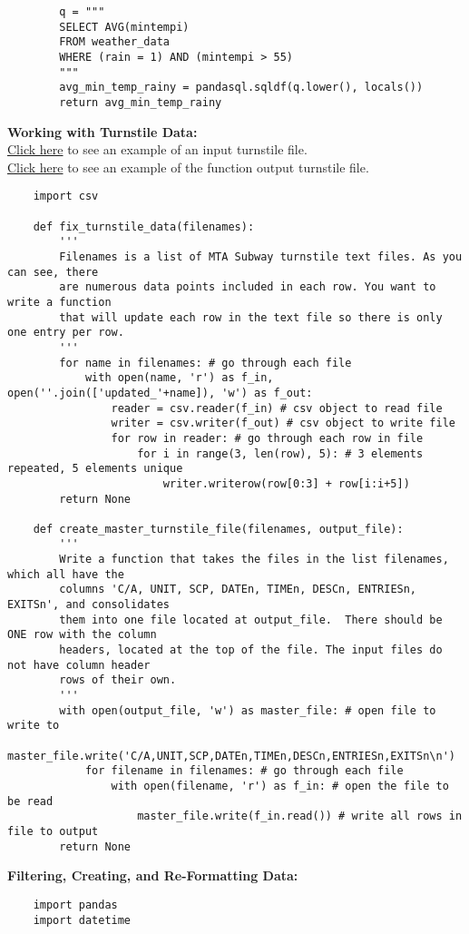 \documentclass[11pt, a4paper]{article}
\begin{document}
\begin{spacing}{1.1}
\begin{lstlisting}
		q = """
		SELECT AVG(mintempi)
		FROM weather_data
		WHERE (rain = 1) AND (mintempi > 55)
		"""
		avg_min_temp_rainy = pandasql.sqldf(q.lower(), locals())
		return avg_min_temp_rainy	
	\end{lstlisting}\newpage

	\noindent \textbf{Working with Turnstile Data:}\vspace*{1mm}\\
	\href{http://video.udacity-data.com.s3.amazonaws.com/topher/2017/January/58733a51_turnstile-110528/turnstile-110528.txt}{Click here} to see an example of an input turnstile file. \\
	\href{http://video.udacity-data.com.s3.amazonaws.com/topher/2017/January/58733aca_solution-turnstile-110528/solution-turnstile-110528.txt}{Click here} to see an example of the function output turnstile file. 
	\begin{lstlisting}
	import csv
	
	def fix_turnstile_data(filenames):
		'''
		Filenames is a list of MTA Subway turnstile text files. As you can see, there
		are numerous data points included in each row. You want to write a function
		that will update each row in the text file so there is only one entry per row.
		'''
		for name in filenames: # go through each file
			with open(name, 'r') as f_in, open(''.join(['updated_'+name]), 'w') as f_out:
				reader = csv.reader(f_in) # csv object to read file
				writer = csv.writer(f_out) # csv object to write file
				for row in reader: # go through each row in file
					for i in range(3, len(row), 5): # 3 elements repeated, 5 elements unique
						writer.writerow(row[0:3] + row[i:i+5])
		return None
		
	def create_master_turnstile_file(filenames, output_file):
		'''
		Write a function that takes the files in the list filenames, which all have the 
		columns 'C/A, UNIT, SCP, DATEn, TIMEn, DESCn, ENTRIESn, EXITSn', and consolidates
		them into one file located at output_file.  There should be ONE row with the column
		headers, located at the top of the file. The input files do not have column header
		rows of their own.
		'''
		with open(output_file, 'w') as master_file: # open file to write to
			master_file.write('C/A,UNIT,SCP,DATEn,TIMEn,DESCn,ENTRIESn,EXITSn\n')
			for filename in filenames: # go through each file
				with open(filename, 'r') as f_in: # open the file to be read
					master_file.write(f_in.read()) # write all rows in file to output
		return None
		\end{lstlisting} \vspace*{1mm}
	\textbf{Filtering, Creating, and Re-Formatting Data:}
	\begin{lstlisting}
	import pandas
	import datetime
	

\end{lstlisting}
\end{spacing}
\end{document}
